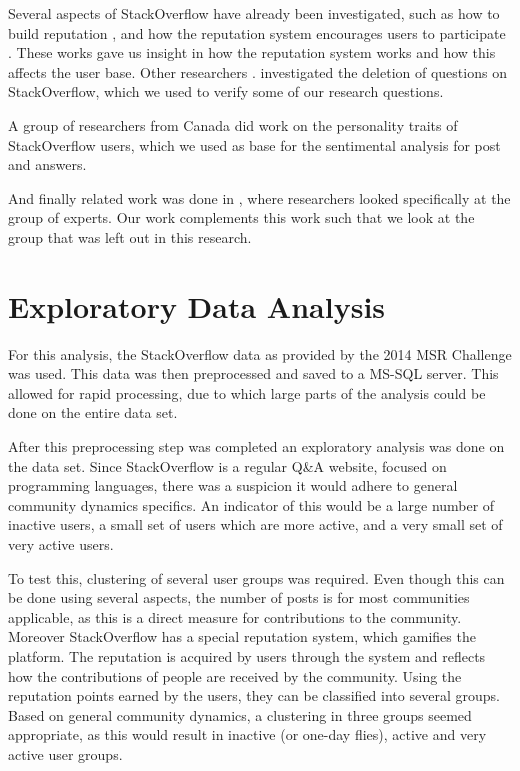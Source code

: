 \documentclass[conference]{IEEEtran}
\begin{document}
Several aspects of StackOverflow have already been investigated, such as how to
build reputation \cite{bosu2013building}, and how the reputation system
encourages users to participate \cite{movshovitz2013analysis}. These works gave
us insight in how the reputation system works and how this affects the user
base. Other researchers \cite{correa2014chaff}. investigated the deletion of
questions on StackOverflow, which we used to verify some of our research
questions. 

A group of researchers from Canada \cite{bazelli2013personality} did work on
the personality traits of StackOverflow users, which we used as base for the
sentimental analysis for post and answers.

And finally related work was done in \cite{yang2014sparrows}, where researchers
looked specifically at the group of experts. Our work complements this work
such that we look at the group that was left out in this research.


\section{Exploratory Data Analysis}

For this analysis, the StackOverflow data as provided by the 2014 MSR Challenge was used. This data was then preprocessed and saved to a MS-SQL server. This allowed for rapid processing, due to which large parts of the analysis could be done on the entire data set.

After this preprocessing step was completed an exploratory analysis was done on the data set. Since StackOverflow is a regular Q\&A website, focused on programming languages, there was a suspicion it would adhere to general community dynamics specifics. An indicator of this would be a large number of inactive users, a small set of users which are more active, and a very small set of very active users.

To test this, clustering of several user groups was required. Even though  this can be done using several aspects, the number of posts is for most communities applicable, as this is a direct measure for contributions to the community. Moreover StackOverflow has a special reputation system, which gamifies the platform. The reputation is acquired by users through the system and reflects how the contributions of people are received by the community. Using the reputation points earned by the users, they can be classified into several groups. Based  on general community dynamics, a clustering in three groups seemed appropriate, as this would result in inactive (or one-day flies), active and very active user groups.
\end{document}
